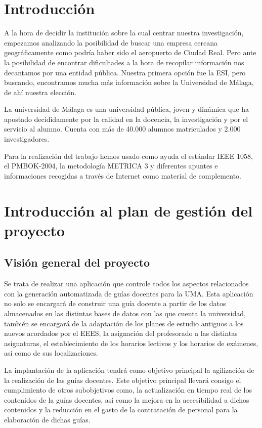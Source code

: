 \documentclass[11pt,a4paper,spanish,twoside]{report}
\begin{document}
\tableofcontents

\chapter*{Introducción}
A la hora de decidir la institución sobre la cual centrar nuestra 
investigación, empezamos analizando la posibilidad de buscar una empresa 
cercana geográficamente como podría haber sido el aeropuerto de Ciudad Real. 
Pero ante la posibilidad de encontrar dificultades a la hora de recopilar 
información nos decantamos por una entidad pública. Nuestra primera opción fue 
la ESI, pero buscando, encontramos mucha más información sobre la Universidad 
de Málaga, de ahí nuestra elección.

La universidad de Málaga es una universidad pública, joven y dinámica que ha 
apostado decididamente por la calidad en la docencia, la investigación y por el
servicio al alumno. Cuenta con más de 40.000 alumnos matriculados y 2.000 
investigadores. 

Para la realización del trabajo hemos usado como ayuda el estándar IEEE 1058, 
el PMBOK-2004, la metodología METRICA 3 y diferentes apuntes e informaciones 
recogidas a través de Internet como material de complemento.

\chapter{Introducción al plan de gestión del proyecto}
\section{Visión general del proyecto}
Se trata de realizar una aplicación que controle todos los aspectos 
relacionados con la generación automatizada de guías docentes para la UMA.
Esta aplicación no solo se encargará de construir una guía docente a partir de 
los datos almacenados en las distintas bases de datos con las que cuenta la 
universidad, también se encargará de la adaptación de los planes de estudio 
antiguos a los nuevos acordados por el EEES, la asignación del profesorado a 
las distintas asignaturas, el establecimiento de los horarios lectivos y los 
horarios de exámenes, así como de sus localizaciones.

La implantación de la aplicación tendrá como objetivo principal la agilización 
de la realización de las guías docentes. Este objetivo principal llevará 
consigo el cumplimiento de otros subobjetivos como, la actualización en tiempo 
real de los contenidos de la guías docentes, así como la mejora en la 
accesibilidad a dichos contenidos y la reducción en el gasto de la 
contratación de personal para la elaboración de dichas guías.
\end{document}
